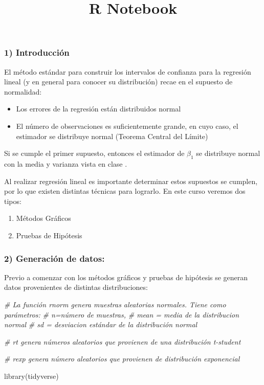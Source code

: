 \documentclass[
]{article}
\title{R Notebook}
\author{}
\date{\vspace{-2.5em}}
\newenvironment{Shaded}{\begin{snugshade}}{\end{snugshade}}
\newcommand{\CommentTok}[1]{\textcolor[rgb]{0.56,0.35,0.01}{\textit{#1}}}
\newcommand{\FunctionTok}[1]{\textcolor[rgb]{0.00,0.00,0.00}{#1}}
\newcommand{\NormalTok}[1]{#1}
\providecommand{\tightlist}{%
  \setlength{\itemsep}{0pt}\setlength{\parskip}{0pt}}
\begin{document}
\maketitle

\hypertarget{introducciuxf3n}{%
\subsubsection{1) Introducción}\label{introducciuxf3n}}

El método estándar para construir los intervalos de confianza para la
regresión lineal (y en general para conocer su distribución) recae en el
supuesto de normalidad:

\begin{itemize}
\tightlist
\item
  Los errores de la regresión están distribuidos normal
\item
  El número de observaciones es suficientemente grande, en cuyo caso, el
  estimador se distribuye normal (Teorema Central del Límite)
\end{itemize}

Si se cumple el primer supuesto, entonces el estimador de \(\beta_1\) se
distribuye normal con la media y varianza vista en clase .

Al realizar regresión lineal es importante determinar estos supuestos se
cumplen, por lo que existen distintas técnicas para lograrlo. En este
curso veremos dos tipos:

\begin{enumerate}
\def\labelenumi{\alph{enumi})}
\tightlist
\item
  Métodos Gráficos
\item
  Pruebas de Hipótesis
\end{enumerate}

\hypertarget{generaciuxf3n-de-datos}{%
\subsubsection{2) Generación de datos:}\label{generaciuxf3n-de-datos}}

Previo a comenzar con los métodos gráficos y pruebas de hipótesis se
generan datos provenientes de distintas distribuciones:

\begin{Shaded}
\begin{Highlighting}[]
\CommentTok{\# La función rnorm genera muestras aleatorias normales. Tiene como parámetros: }
\CommentTok{\# n=número de muestras, }
\CommentTok{\# mean = media de la distribucion normal }
\CommentTok{\# sd = desviacion estándar de la distribución normal}

\CommentTok{\# rt genera números aleatorios que provienen de una distribución t{-}student}

\CommentTok{\# rexp genera número aleatorios que provienen de distribución exponencial}

\FunctionTok{library}\NormalTok{(tidyverse)}
\end{Highlighting}
\end{Shaded}
\end{document}
